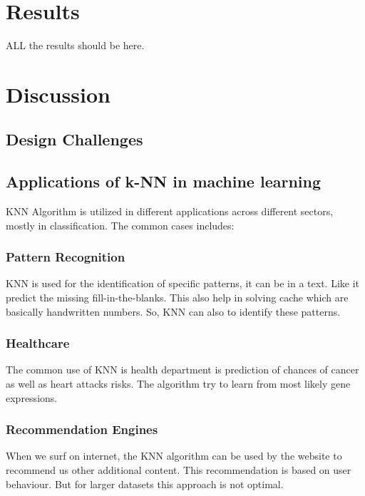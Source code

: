 \documentclass[conference]{IEEEtran}
\begin{document}


\section{Results}
ALL the results should be here. 

\section{Discussion}

\subsection{Design Challenges}


\subsection{Applications of k-NN in machine learning}
KNN Algorithm is utilized in different applications across different sectors, mostly in classification. The common cases includes:


\subsubsection{Pattern Recognition}
KNN is used for the identification of specific patterns, it can be in a text. Like it predict the missing fill-in-the-blanks. This also help in solving cache which are basically handwritten numbers. So, KNN can also
to identify these patterns.


\subsubsection{Healthcare}
The common use of KNN is health department is prediction of chances of cancer as well as heart attacks risks. The algorithm try to learn from most likely gene expressions. 

\subsubsection{Recommendation Engines}
When we surf on internet, the KNN algorithm can be used by the website to recommend us other additional content. This recommendation is based on user behaviour. But for larger datasets this approach is not optimal. 
\end{document}
